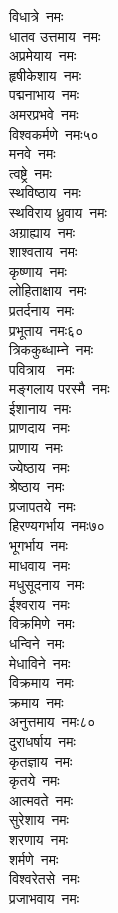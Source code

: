 \begin{multicols}{2}
\begin{flushleft}
विधात्रे~नमः\\
धातव उत्तमाय~नमः\\
अप्रमेयाय~नमः\\
हृषीकेशाय~नमः\\
पद्मनाभाय~नमः\\
अमरप्रभवे~नमः\\
विश्वकर्मणे~नमः\hfill ५०\\
मनवे~नमः\\
त्वष्ट्रे~नमः\\
स्थविष्ठाय~नमः\\
स्थविराय ध्रुवाय~नमः\\
अग्राह्याय~नमः\\
शाश्वताय~नमः\\
कृष्णाय~नमः\\
लोहिताक्षाय~नमः\\
प्रतर्दनाय~नमः\\
प्रभूताय~नमः\hfill ६०\\
त्रिककुब्धाम्ने~नमः\\
पवित्राय ~नमः\\
मङ्गलाय परस्मै~नमः\\
ईशानाय~नमः\\
प्राणदाय~नमः\\
प्राणाय~नमः\\
ज्येष्ठाय~नमः\\
श्रेष्ठाय~नमः\\
प्रजापतये~नमः\\
हिरण्यगर्भाय~नमः\hfill ७०\\
भूगर्भाय~नमः\\
माधवाय~नमः\\
मधुसूदनाय~नमः\\
ईश्वराय~नमः\\
विक्रमिणे~नमः\\
धन्विने~नमः\\
मेधाविने~नमः\\
विक्रमाय~नमः\\
क्रमाय~नमः\\
अनुत्तमाय~नमः\hfill ८०\\
दुराधर्षाय~नमः\\
कृतज्ञाय~नमः\\
कृतये~नमः\\
आत्मवते~नमः\\
सुरेशाय~नमः\\
शरणाय~नमः\\
शर्मणे~नमः\\
विश्वरेतसे~नमः\\
प्रजाभवाय~नमः\\

\end{flushleft}
\end{multicols}
